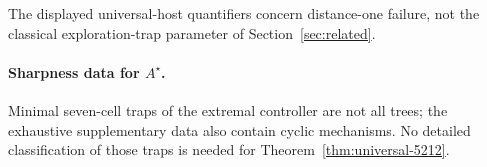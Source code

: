 The displayed universal-host quantifiers concern distance-one failure, not the
classical exploration-trap parameter of Section~\ref{sec:related}.
\paragraph{Sharpness data for $A^\star$.}
Minimal seven-cell traps of the extremal controller are not all trees; the exhaustive
supplementary data also contain cyclic mechanisms.  No detailed classification of
those traps is needed for Theorem~\ref{thm:universal-5212}.
